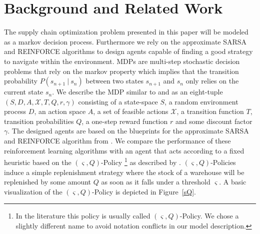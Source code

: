 \documentclass[journal, a4paper]{IEEEtran}
\newcommand{\argmax}{\operatornamewithlimits{argmax}}
\newcommand{\x}{\mathbf{x}}
\newcommand{\y}{\mathbf{y}}
\newcommand{\ypred}{\mathbf{\hat y}}
\theoremstyle{plain}
\theoremstyle{definition}
\begin{document}
\section{Background and Related Work}
\label{sec:background}
The supply chain optimization problem presented in this paper will be modeled as a markov decision process. Furthermore we rely on the approximate SARSA and REINFORCE algorithms to design agents capable of finding a good strategy to navigate within the environment. \newline
MDPs are multi-step stochastic decision problems that rely on the markov property which implies that the transition probability $P(s_{n+1} \ | \  s_n)$ between two states $s_{n+1}$ and $s_n$ only relies on the current state $s_n$. We describe the MDP similar to \cite{Moritz} and \cite{PowellADP} as an eight-tuple $(S, D, A, \mathcal{X}, T, Q, r, \gamma)$ consisting of a state-space $S$, a random environment process $D$, an action space $A$, a set of feasible actions $\mathcal{X}$, a transition function $T$, transition probabilities $Q$, a one-step reward function $r$ and some discount factor $\gamma$. \newline
The designed agents are based on the blueprints for the approximate SARSA and REINFORCE algorithm from \cite{LectureDRL}. We compare the performance of these reinforcement learning algorithms with an agent that acts according to a fixed heuristic based on the $(\varsigma, Q)$-Policy \footnote{In the literature this policy is usually called $(\varsigma, Q)$-Policy. We chose a slightly different name to avoid notation conflicts in our model description.} as described by \cite{sQ}. $(\varsigma, Q)$-Policies induce a simple replenishment strategy where the stock of a warehouse will be replenished by some amount $Q$ as soon as it falls under a threshold $\varsigma$. A basic visualization of the $(\varsigma, Q)$-Policy is depicted in Figure~\ref{sQ}.
\end{document}
